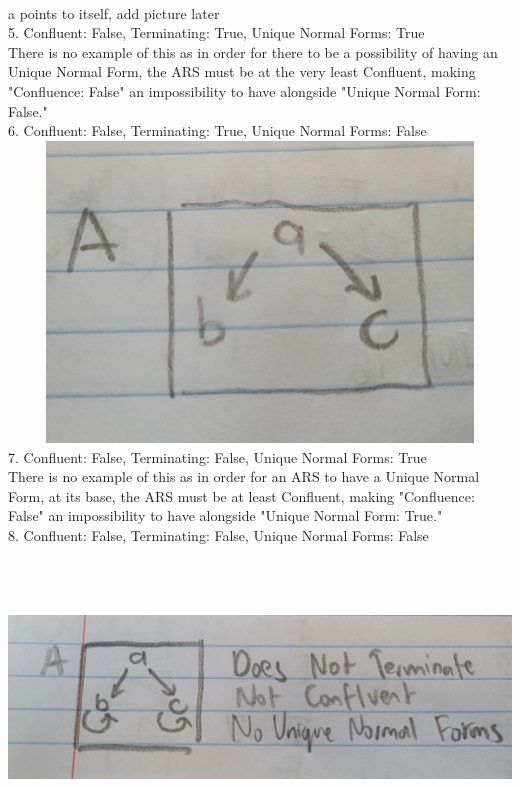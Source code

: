 \documentclass{article}
\theoremstyle{theorem}
\theoremstyle{definition}
\theoremstyle{remark}
\begin{document}
\\ a points to itself, add picture later
\\ 5. Confluent: False, Terminating: True, Unique Normal Forms: True
\\ There is no example of this as in order for there to be a possibility of having an Unique Normal Form, the ARS must be at the very least Confluent, making "Confluence: False" an impossibility to have alongside "Unique Normal Form: False." 
\\ 6. Confluent: False, Terminating: True, Unique Normal Forms: False
\\ \includegraphics[width=15cm, height=8cm]{Report Images/week7_11.jpg}
\\ 7. Confluent: False, Terminating: False, Unique Normal Forms: True
\\ There is no example of this as in order for an ARS to have a Unique Normal Form, at its base, the ARS must be at least Confluent, making "Confluence: False" an impossibility to have alongside "Unique Normal Form: True."
\\ 8. Confluent: False, Terminating: False, Unique Normal Forms: False
\\ \includegraphics[width=15cm, height=8cm]{Report Images/week7_7.jpg}
\end{document}
